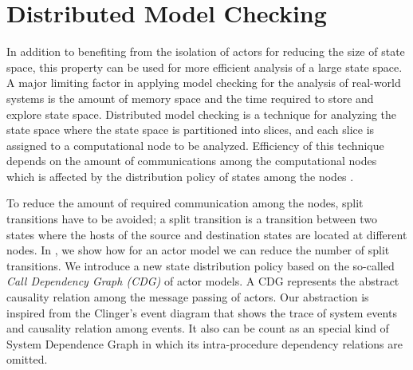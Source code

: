 \section{Distributed Model Checking} \label{sec::DMC}
In addition to benefiting from the isolation of actors for reducing the size of state space, this property can be used for more efficient analysis of a large state space. A major limiting factor in applying model checking for the analysis of real-world systems is the amount of memory space and the time required to store and explore state space. Distributed model checking is a technique for analyzing the state space
where the state space is partitioned into slices, and each slice is assigned to a computational node to be analyzed. Efficiency of this technique depends on the %
amount of communications among the computational nodes which is affected by the distribution policy of states among the nodes \cite{DBLP:journals/entcs/OrzanPE05}. 

To reduce the 
amount of required communication among the nodes, split transitions have to be avoided; a split transition is a transition between two states where the hosts of the source and destination states are located at different nodes. In \cite{DBLP:journals/eceasst/KhamespanahSMSR15}, we show how
for an actor model we can
reduce the number of split transitions. We introduce a new state distribution policy based on the so-called \textit{Call Dependency Graph (CDG)} of actor models. A CDG represents the abstract causality relation among %
the message passing of actors. Our abstraction is inspired from the Clinger's event diagram \cite{clinger} that shows the trace of system events and causality relation among events. It also can be count as an special kind of System Dependence Graph in which its intra-procedure dependency relations are omitted. \cite{DBLP:conf/scam/Graf10}

